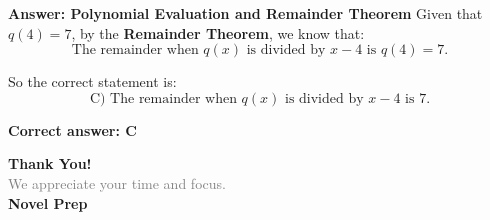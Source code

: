 \documentclass{beamer}
\begin{document}
\begin{frame}{\textbf{Answer: Polynomial Evaluation and Remainder Theorem}}
Given that $q(4) = 7$, by the \textbf{Remainder Theorem}, we know that:
\[
\text{The remainder when } q(x) \text{ is divided by } x - 4 \text{ is } q(4) = 7.
\]

So the correct statement is:
\[
\boxed{\text{C) The remainder when } q(x) \text{ is divided by } x - 4 \text{ is } 7.}
\]

\bigskip
\textbf{Correct answer: C}
\end{frame}













\begin{frame}{}

    \centering
    \vspace{5em}

    {\Huge \textbf{\textcolor{novelPurple}{Thank You!}}} \\[1em]
    {\large \textcolor{gray}{We appreciate your time and focus.}} \\[3em]

    {\LARGE \textbf{\textcolor{novelPurple}{\textsf{Novel Prep}}}}

    \vfill
\end{frame}
\end{document}
